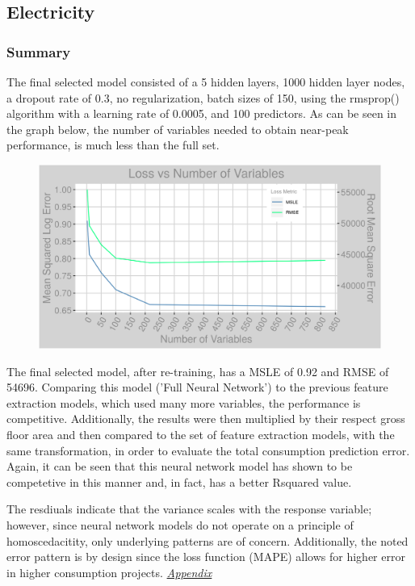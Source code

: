 \subsection{Electricity}
\subsubsection{Summary}
The final selected model consisted of a 5 hidden layers, 1000 hidden layer nodes, a dropout rate of 0.3, no regularization, batch sizes of 150, using the rmsprop() algorithm with a learning rate of 0.0005, and 100 predictors.  As can be seen in the graph below, the number of variables needed to obtain near-peak performance, is much less than the full set.

\begin{figure}[h]
\centering
\includegraphics[width=\textwidth, height=0.25\textheight]{Images/electricity_psf_nn_error.png}
\end{figure}

The final selected model, after re-training, has a MSLE of 0.92 and RMSE of 54696.  Comparing this model ('Full Neural Network') to the previous feature extraction models, which used many more variables, the performance is competitive.  Additionally, the results were then multiplied by their respect gross floor area and then compared to the set of feature extraction models, with the same transformation, in order to evaluate the total consumption prediction error.  Again, it can be seen that this neural network model has shown to be competetive in this manner and, in fact, has a better Rsquared value.

The resdiuals indicate that the variance scales with the response variable; however, since neural network models do not operate on a principle of homoscedacitity, only underlying patterns are of concern. Additionally, the noted error pattern is by design since the loss function (MAPE) allows for higher error in higher consumption projects.  \textit{\hyperref[appendix_nn:electricity:nn_full]{Appendix}}

